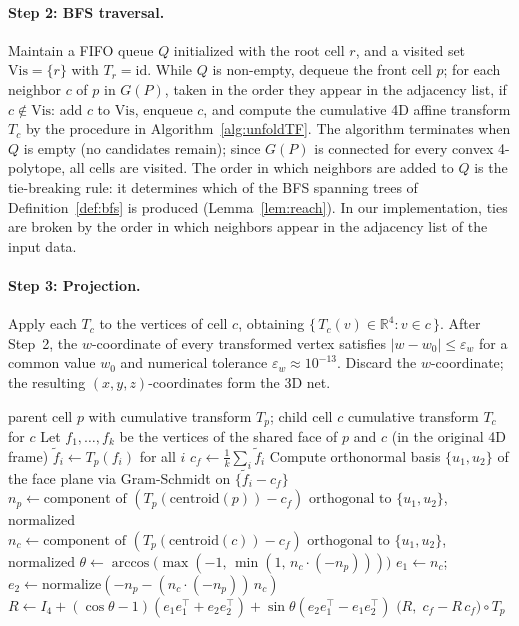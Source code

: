 \documentclass[11pt,letterpaper]{article}
\newcommand{\RR}{\mathbb{R}}
\newcommand{\eps}{\varepsilon}
\begin{document}
\paragraph{Step 2: BFS traversal.}
Maintain a FIFO queue $Q$ initialized with the root cell $r$,
and a visited set $\mathrm{Vis} = \{r\}$ with $T_r = \mathrm{id}$.
While $Q$ is non-empty, dequeue the front cell $p$;
for each neighbor $c$ of $p$ in $G(P)$, taken in the order they
appear in the adjacency list, if $c \notin \mathrm{Vis}$: add $c$ to $\mathrm{Vis}$,
enqueue $c$, and compute the cumulative 4D affine transform $T_c$
by the procedure in Algorithm~\ref{alg:unfoldTF}.
The algorithm terminates when $Q$ is empty (no candidates remain);
since $G(P)$ is connected for every convex 4-polytope,
all cells are visited.
The order in which neighbors are added to $Q$ is the tie-breaking
rule: it determines which of the BFS spanning trees of
Definition~\ref{def:bfs} is produced (Lemma~\ref{lem:reach}).
In our implementation, ties are broken by the order in which neighbors
appear in the adjacency list of the input data.

\paragraph{Step 3: Projection.}
Apply each $T_c$ to the vertices of cell $c$, obtaining
$\{\,T_c(v)\in\RR^4 : v \in c\,\}$.
After Step~2, the $w$-coordinate of every transformed vertex satisfies
$|w - w_0| \le \eps_w$ for a common value $w_0$ and numerical
tolerance $\eps_w \approx 10^{-13}$.
Discard the $w$-coordinate; the resulting $(x,y,z)$-coordinates form
the 3D net.

\begin{algorithm}[ht]
\caption{\textsc{UnfoldTransform}$(p, c, T_p)$}
\label{alg:unfoldTF}
\begin{algorithmic}[1]
\Require parent cell $p$ with cumulative transform $T_p$; child cell $c$
\Ensure cumulative transform $T_c$ for $c$
\State Let $f_1,\ldots,f_k$ be the vertices of the shared face of $p$ and $c$
       (in the original 4D frame)
\State $\tilde{f}_i \leftarrow T_p(f_i)$ for all $i$
\State $c_f \leftarrow \frac{1}{k}\sum_i \tilde{f}_i$
\State Compute orthonormal basis $\{u_1, u_2\}$ of the face plane via
       Gram-Schmidt on $\{\tilde{f}_i - c_f\}$
\State $n_p \leftarrow \text{component of }(T_p(\mathrm{centroid}(p)) - c_f)
       \text{ orthogonal to } \{u_1,u_2\}$, normalized
\State $n_c \leftarrow \text{component of }(T_p(\mathrm{centroid}(c)) - c_f)
       \text{ orthogonal to } \{u_1,u_2\}$, normalized
\State $\theta \leftarrow \arccos\!\bigl(\max(-1,\,\min(1,\,n_c\cdot(-n_p)))\bigr)$
\State $e_1 \leftarrow n_c$; \;
       $e_2 \leftarrow \mathrm{normalize}(-n_p - (n_c\cdot(-n_p))\,n_c)$
\State $R \leftarrow I_4 + (\cos\theta-1)(e_1 e_1^\top + e_2 e_2^\top)
       + \sin\theta(e_2 e_1^\top - e_1 e_2^\top)$
\State \Return $\bigl(R,\; c_f - R\,c_f\bigr)\circ T_p$
\end{algorithmic}
\end{algorithm}
\end{document}
